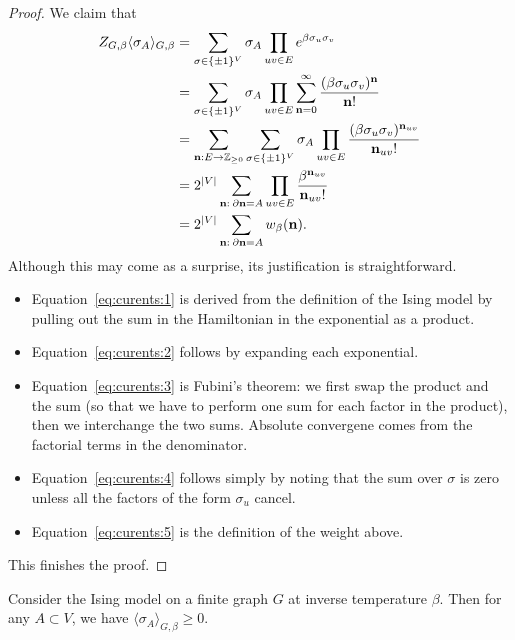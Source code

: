 \begin{proof}
    We claim that
    \begin{align}
        \label{eq:curents:1}
        Z_{G,\beta}\langle\sigma_A\rangle_{G,\beta}
        &=
        \sum_{\sigma\in\{\pm1\}^V}
        \sigma_A
        \prod_{uv\in E}
        e^{\beta\sigma_u\sigma_v}
        \\
        \label{eq:curents:2}
        &=
        \sum_{\sigma\in\{\pm1\}^V}
        \sigma_A
        \prod_{uv\in E}
        \sum_{\n=0}^\infty
        \frac{(\beta\sigma_u\sigma_v)^\n}{\n!}
        \\
        \label{eq:curents:3}
        &=
        \sum_{\n:E\to\Z_{\geq 0}}
        \sum_{\sigma\in\{\pm1\}^V}
        \sigma_A
        \prod_{uv\in E}
        \frac{(\beta\sigma_u\sigma_v)^{\n_{uv}}}{\n_{uv}!}
        \\
        \label{eq:curents:4}
        &=
        2^{|V|}\sum_{\n:\:\partial\n=A}
        \prod_{uv\in E}
        \frac{\beta^{\n_{uv}}}{\n_{uv}!}
        \\
        \label{eq:curents:5}
        &=
        2^{|V|}
        \sum_{\n:\:\partial\n=A}
        w_\beta(\n).
    \end{align}
    Although this may come as a surprise, its justification is straightforward.
    \begin{itemize}
        \item Equation~\eqref{eq:curents:1} is derived from the definition
        of the Ising model by pulling out the sum in the Hamiltonian in
        the exponential as a product.
        \item Equation~\eqref{eq:curents:2} follows by expanding each exponential.
        \item Equation~\eqref{eq:curents:3} is Fubini's theorem:
        we first swap the product and the sum (so that we have to perform one sum for each
        factor in the product), then we interchange the two sums.
        Absolute convergene comes from the factorial terms in the denominator.
        \item Equation~\eqref{eq:curents:4} follows simply by noting that the sum over $\sigma$ is zero unless
        all the factors of the form $\sigma_u$ cancel.
        \item Equation~\eqref{eq:curents:5} is the definition of the weight above.
    \end{itemize}
    This finishes the proof.
\end{proof}

\begin{corollary}
    Consider the Ising model on a finite graph $G$ at inverse temperature $\beta$.
    Then for any $A\subset V$, we have $\langle\sigma_A\rangle_{G,\beta}\geq 0$.
\end{corollary}


